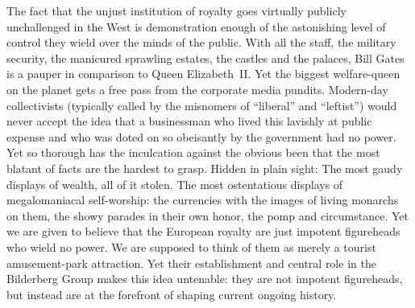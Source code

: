 \documentclass[letterpaper,12pt]{article}
\makeatletter
\newcommand{\asterism}{\smash{%
  \raisebox{-.5ex}{%
    \setlength{\tabcolsep}{-.5pt}%
    \begin{tabular}{@{}cc@{}}%
      \multicolumn2c*\\[-2ex]*&*%
    \end{tabular}}}}
\makeatother
\begin{document}
The fact that the unjust institution of royalty goes virtually publicly unchallenged in the West is demonstration enough of the astonishing level of control they wield over the minds of the public. With all the staff, the military security, the manicured sprawling estates, the castles and the palaces, Bill Gates is a pauper in comparison to Queen Elizabeth~II. Yet the biggest welfare-queen on the planet gets a free pass from the corporate media pundits. Modern-day collectivists (typically called by the misnomers of ``liberal'' and ``leftist'') would never accept the idea that a businessman who lived this lavishly at public expense and who was doted on so obeisantly by the government had no power. Yet so thorough has the inculcation against the obvious been that the most blatant of facts are the hardest to grasp. Hidden in plain sight: The most gaudy displays of wealth, all of it stolen. The most ostentatious displays of megalomaniacal self-worship: the currencies with the images of living monarchs on them, the showy parades in their own honor, the pomp and circumstance. Yet we are given to believe that the European royalty are just impotent figureheads who wield no power. We are supposed to think of them as merely a tourist amusement-park attraction. Yet their establishment and central role in the Bilderberg Group makes this idea untenable: they are not impotent figureheads, but instead are at the forefront of shaping current ongoing history.

\vspace{1em}
\centerline{\asterism}
\vspace{1em}
\end{document}
